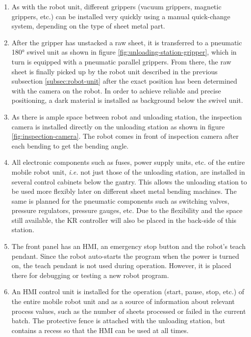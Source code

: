 \begin{enumerate}
    \item As with the robot unit, different grippers (vacuum grippers, magnetic grippers, etc.) can be
    installed very quickly using a manual quick-change system, depending on the type of sheet metal part.
    \item After the gripper has unstacked a raw sheet, it is transferred to a pneumatic 180° swivel unit as shown in figure \ref{fig:unloading-station-gripper}, which in
    turn is equipped with a pneumatic parallel grippers. From
    there, the raw sheet is finally picked up by the robot unit described in the previous subsection \ref{subsec:robot-unit} after the
    exact position has been determined with the camera on the robot. In order to achieve reliable and
    precise positioning, a dark material is installed as background below the swivel unit. 
    \item As there is ample space between robot and unloading station, the inspection camera is installed directly on the unloading station as shown in figure \ref{fig:inspection-camera}.
    The robot comes in front of inspection camera after each bending to get the bending angle.
    \item All electronic
    components such as fuses, power supply units, etc. of the entire mobile robot unit, \textit{i.e.} not just those of
    the unloading station, are installed in several control cabinets below the gantry. This allows the
    unloading station to be used more flexibly later on different sheet metal bending machines. The same is
    planned for the pneumatic components such as switching valves, pressure regulators, pressure
    gauges, etc. Due to the flexibility and the space still available, the KR controller will also be
    placed in the back-side of this station.
    \item The front panel has an HMI, an emergency stop button and the robot's teach pendant. Since the robot auto-starts the program
    when the power is turned on, the teach pendant is not used during operation. However, it is placed there for debugging or testing a new robot program.
    \item An HMI control unit is installed for the operation (start, pause, stop, etc.) of the entire mobile robot unit and as
    a source of information about relevant process values, such as the number of sheets processed or failed in the current batch. 
    The protective fence is attached with
    the unloading station, but contains a recess so that the HMI can be used at all times.
\end{enumerate}









